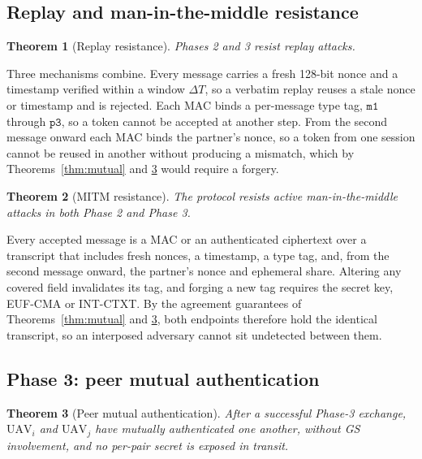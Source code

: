 \documentclass[journal]{IEEEtran}
\newtheorem{theorem}{Theorem}
\begin{document}
\subsection{Replay and man-in-the-middle resistance}

\begin{theorem}[Replay resistance]
\label{thm:replay}
Phases 2 and 3 resist replay attacks.
\end{theorem}

\begin{IEEEproof}
Three mechanisms combine. Every message carries a fresh 128-bit nonce and a
timestamp verified within a window $\Delta T$, so a verbatim replay reuses a
stale nonce or timestamp and is rejected. Each MAC binds a per-message type
tag, $\texttt{m1}$ through $\texttt{p3}$, so a token cannot be accepted at
another step. From the second message onward each MAC binds the partner's
nonce, so a token from one session cannot be reused in another without producing
a mismatch, which by Theorems~\ref{thm:mutual} and \ref{thm:peer} would require
a forgery.
\end{IEEEproof}

\begin{theorem}[MITM resistance]
\label{thm:mitm}
The protocol resists active man-in-the-middle attacks in both Phase 2 and
Phase 3.
\end{theorem}

\begin{IEEEproof}
Every accepted message is a MAC or an authenticated ciphertext over a transcript
that includes fresh nonces, a timestamp, a type tag, and, from the second
message onward, the partner's nonce and ephemeral share. Altering any
covered field invalidates its tag, and forging a new tag requires the secret
key, EUF-CMA or INT-CTXT. By the agreement guarantees of
Theorems~\ref{thm:mutual} and \ref{thm:peer}, both endpoints therefore hold the
identical transcript, so an interposed adversary cannot sit undetected between
them.
\end{IEEEproof}

\subsection{Phase 3: peer mutual authentication}

\begin{theorem}[Peer mutual authentication]
\label{thm:peer}
After a successful Phase-3 exchange, $\text{UAV}_i$ and $\text{UAV}_j$ have
mutually authenticated one another, without GS involvement, and no per-pair
secret is exposed in transit.
\end{theorem}
\end{document}
